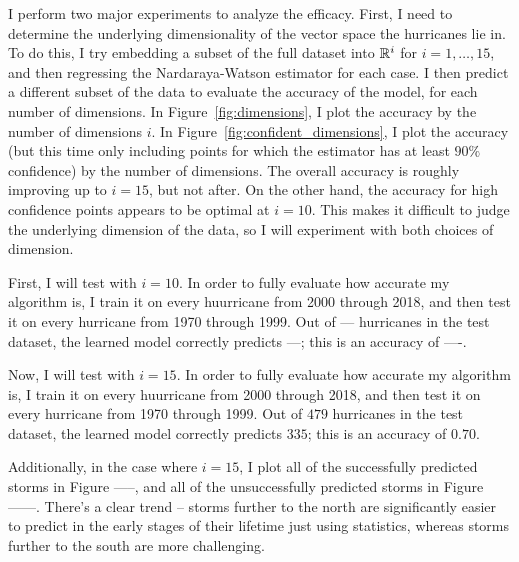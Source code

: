 
\par
I perform two major experiments to analyze the efficacy.
First, I need to determine the underlying dimensionality of the vector space the hurricanes lie in.
To do this, I try embedding a subset of the full dataset into $\mathbb{R}^{i}$ for $i=1,\ldots,15$, and then regressing the Nardaraya-Watson estimator for each case.
I then predict a different subset of the data to evaluate the accuracy of the model, for each number of dimensions.
In Figure~\ref{fig:dimensions}, I plot the accuracy by the number of dimensions $i$.
In Figure~\ref{fig:confident_dimensions}, I plot the accuracy (but this time only including points for which the estimator has at least $90\%$ confidence) by the number of dimensions.
The overall accuracy is roughly improving up to $i=15$, but not after.
On the other hand, the accuracy for high confidence points appears to be optimal at $i=10$.
This makes it difficult to judge the underlying dimension of the data, so I will experiment with both choices of dimension.

\par
First, I will test with $i=10$.
In order to fully evaluate how accurate my algorithm is, I train it on every huurricane from 2000 through 2018, and then test it on every hurricane from 1970 through 1999.
Out of --- hurricanes in the test dataset, the learned model correctly predicts ---; this is an accuracy of ----.

\par
Now, I will test with $i=15$.
In order to fully evaluate how accurate my algorithm is, I train it on every huurricane from 2000 through 2018, and then test it on every hurricane from 1970 through 1999.
Out of $479$ hurricanes in the test dataset, the learned model correctly predicts $335$; this is an accuracy of $0.70$.

\par
Additionally, in the case where $i=15$, I plot all of the successfully predicted storms in Figure -----, and all of the unsuccessfully predicted storms in Figure ------.
There's a clear trend -- storms further to the north are significantly easier to predict in the early stages of their lifetime just using statistics, whereas storms further to the south are more challenging.